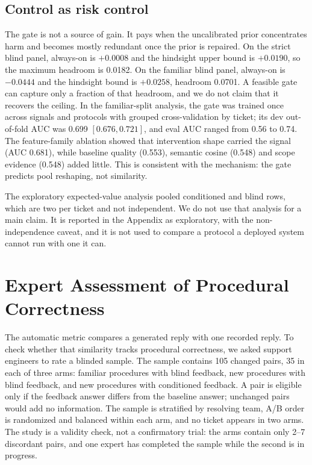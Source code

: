 \documentclass{ieeeaccess}
\begin{document}
\subsection{Control as risk control}
The gate is not a source of gain. It pays when the uncalibrated prior concentrates
harm and becomes mostly redundant once the prior is repaired. On the strict blind
panel, always-on is $+0.0008$ and the hindsight upper bound is $+0.0190$, so the
maximum headroom is 0.0182. On the familiar blind panel, always-on is $-0.0444$ and
the hindsight bound is $+0.0258$, headroom 0.0701. A feasible gate can capture only a
fraction of that headroom, and we do not claim that it recovers the ceiling. In the
familiar-split analysis, the gate was trained once across signals and protocols with
grouped cross-validation by ticket; its dev out-of-fold AUC was 0.699
$[0.676,0.721]$, and eval AUC ranged from 0.56 to 0.74. The feature-family
ablation showed that intervention shape carried the signal (AUC 0.681), while
baseline quality (0.553), semantic cosine (0.548) and scope evidence (0.548) added
little. This is consistent with the mechanism: the gate
predicts pool reshaping, not similarity.

The exploratory expected-value analysis pooled conditioned and blind
rows, which are two per ticket and not independent. We do not use that analysis for
a main claim. It is reported in the Appendix as exploratory, with the
non-independence caveat, and it is not used to compare a protocol a deployed system
cannot run with one it can.


\section{Expert Assessment of Procedural Correctness}
\label{sec:expert}

The automatic metric compares a generated reply with one recorded reply. To check
whether that similarity tracks procedural correctness, we asked support engineers
to rate a blinded sample. The sample contains 105 changed pairs, 35 in each of
three arms: familiar procedures with blind feedback, new procedures with blind
feedback, and new procedures with conditioned feedback. A pair is eligible only if
the feedback answer differs from the baseline answer; unchanged pairs would add no
information. The sample is stratified by resolving team, A/B order is randomized
and balanced within each arm, and no ticket appears in two arms. The study is a
validity check, not a confirmatory trial: the arms contain only 2--7 discordant
pairs, and one expert has completed the sample while the second is in progress.
\end{document}
